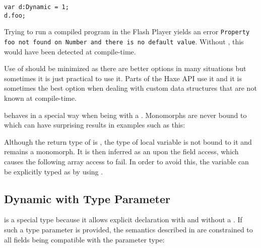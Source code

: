 \begin{lstlisting}
var d:Dynamic = 1;
d.foo;
\end{lstlisting}

Trying to run a compiled program in the Flash Player yields an error \texttt{Property foo not found on Number and there is no default value}. Without , this would have been detected at compile-time.


Use of  should be minimized as there are better options in many situations but sometimes it is just practical to use it. Parts of the Haxe  API use it and it is sometimes the best option when dealing with custom data structures that are not known at compile-time.

 behaves in a special way when being  with a . Monomorphs are never bound to  which can have surprising results in examples such as this:


Although the return type of  is , the type of local variable  is not bound to it and remains a monomorph. It is then inferred as an  upon the  field access, which causes the following  array access to fail. In order to avoid this, the variable  can be explicitly typed as  by using .


\subsection{Dynamic with Type Parameter}
\label{types-dynamic-with-type-parameter}

 is a special type because it allows explicit declaration with and without a . If such a type parameter is provided, the semantics described in  are constrained to all fields being compatible with the parameter type:

